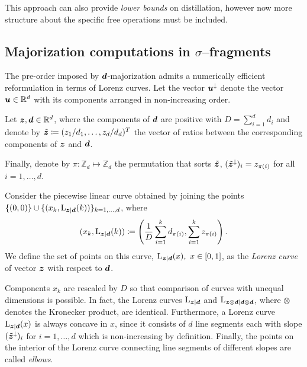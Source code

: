 \documentclass[pra,
aps,
twocolumn,
superscriptaddress,
groupedaddress,
nofootinbib,
reprint
]{revtex4-1}
\begin{document}
This approach can also provide \emph{lower bounds} on distillation, however now more structure about the specific free operations must be included. 


\subsection{Majorization computations in $\sigma$--fragments}
The pre-order imposed by $\bm{d}$-majorization admits a numerically efficient reformulation in terms of Lorenz curves.
Let the vector $\bm{u}^\downarrow$ denote the vector $\bm{u} \in \mathbb{R}^d$ with its components arranged in non-increasing order.
\begin{definition}\label{def:lc}
    Let $\bm{z}, \bm{d} \in \mathbb{R}^d$, where the components of $\bm{d}$ are positive with $D = \sum_{i=1}^d d_i$ and denote by $\tilde{\bm{z}} \coloneqq (z_1/d_1, \dots, z_d/d_d)^T$ the vector of ratios between the corresponding components of $\bm{z}$ and $\bm{d}$.
    
    Finally, denote by $\pi: \mathbb{Z}_d \mapsto \mathbb{Z}_d$ the permutation that sorts $\tilde{\bm{z}}$, $(\tilde{\bm{z}}^\downarrow)_i = z_{\pi(i)}$ for all $i=1,\dots,d$.
    
    Consider the piecewise linear curve obtained by joining the points $\{(0,0)\} \cup \{ (x_k, {{\rm{L}}_{\bm{z}|\bm{d}}}(k)) \}_{k=1,\dots,d}$, where
    \begin{equation}\label{eq:lorenz}
        (x_k, {{\rm{L}}_{\bm{z}|\bm{d}}}(k)) \coloneqq \left( \frac{1}{D}\sum_{i=1}^k d_{\pi(i)}, \sum_{i=1}^k z_{\pi(i)} \right).
    \end{equation}
    We define the set of points on this curve, ${{\rm{L}}_{\bm{z}|\bm{d}}}(x),\ x \in [0,1]$, as the \emph{Lorenz curve} of vector $\bm{z}$ with respect to $\bm{d}$.
\end{definition}
Components $x_k$ are rescaled by $D$ so that comparison of curves with unequal dimensions is possible.
In fact, the Lorenz curves ${{\rm{L}}_{\bm{z}|\bm{d}}}$ and ${{\rm{L}}_{\bm{z} \otimes \bm{d}|\bm{d} \otimes \bm{d}}}$, where $\otimes$ denotes the Kronecker product, are identical.
Furthermore, a Lorenz curve ${{\rm{L}}_{\bm{z}|\bm{d}}}(x)$ is always concave in $x$, since it consists of $d$ line segments each with slope $(\tilde{\bm{z}}^\downarrow)_i$ for $i=1,\dots,d$ which is non-increasing by definition.
Finally, the points on the interior of the Lorenz curve connecting line segments of different slopes are called \emph{elbows}.
\end{document}
